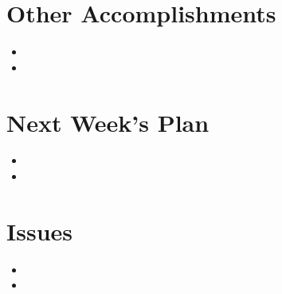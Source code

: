 \documentclass[11pt]{article}
\begin{document}
%
%
\section{Other Accomplishments}
\begin{itemize}
\item
\item
\end{itemize}

%
%
\section{Next Week's Plan}
\begin{itemize}
\item
\item
\end{itemize}

%
%
\section{Issues}
\begin{itemize}
\item
\item
\end{itemize}
\end{document}
